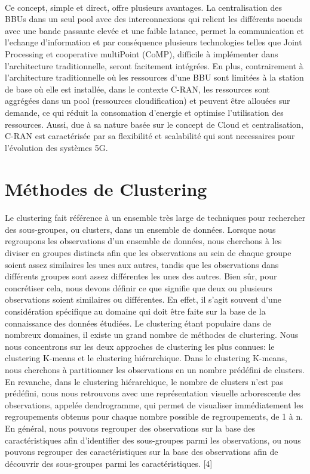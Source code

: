 \documentclass{report}
\begin{document}
\paragraph{}
Ce concept, simple et direct, offre plusieurs avantages. La centralisation des BBUs dans un seul pool avec des interconnexions 
qui relient les différents noeuds avec une bande passante elevée et une faible latance, permet la communication et l'echange d'information et par 
conséquence plusieurs technologies telles que Joint Processing et cooperative multiPoint (CoMP), difficile à implémenter dans l'architecture traditionnelle, seront facitement intégrées. 
En plus, contrairement à l'architecture traditionnelle où les ressources d'une BBU sont limitées à la station de base où elle est installée, dans le contexte C-RAN, 
les ressources sont aggrégées dans un pool (ressources cloudification) et peuvent être allouées sur demande, ce qui réduit la consomation d'energie et optimise l'utilisation des ressources. 
Aussi, due à sa nature basée sur le concept de Cloud et centralisation, C-RAN est caractérisée par sa flexibilité et scalabilité qui sont necessaires pour l'évolution des systèmes 5G.  

\section{Méthodes de Clustering}
\paragraph{}
Le clustering fait référence à un ensemble très large de techniques pour rechercher des sous-groupes, ou clusters, dans un ensemble de données. Lorsque nous regroupons les observations d'un ensemble de données, nous cherchons à les diviser en groupes distincts afin que les observations au sein de chaque groupe soient assez similaires les unes aux autres, tandis que les observations dans différents groupes sont assez différentes les unes des autres. Bien sûr, pour concrétiser cela, nous devons définir ce que signifie que deux ou plusieurs observations soient similaires ou différentes. En effet, il s'agit souvent d'une considération spécifique au domaine qui doit être faite sur la base de la connaissance des données étudiées.
Le clustering étant populaire dans de nombreux domaines, il existe un grand nombre de méthodes de clustering. Nous nous concentrons sur les deux approches de clustering les plus connues: le clustering K-means et le clustering hiérarchique. Dans le clustering K-means, nous cherchons à partitionner les observations en un nombre prédéfini de clusters. En revanche, dans le clustering hiérarchique, le nombre de clusters n'est pas prédéfini, nous nous retrouvons avec une représentation visuelle arborescente des observations, appelée dendrogramme, qui permet de visualiser immédiatement les regroupements obtenus pour chaque nombre possible de regroupements, de 1 à n. 
En général, nous pouvons regrouper des observations sur la base des caractéristiques afin d'identifier des sous-groupes parmi les observations, ou nous pouvons regrouper des caractéristiques sur la base des observations afin de découvrir des sous-groupes parmi les caractéristiques. [4]
\end{document}
